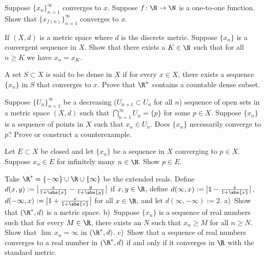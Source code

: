 \documentclass[12pt]{book}
\begin{document}
\begin{exercise}
Suppose $\{x_n\}_{n=1}^\infty$ converges to $x$.
Suppose $f \colon \N
\to \N$ is a one-to-one function.
Show that
$\{ x_{f(n)} \}_{n=1}^\infty$ converges to $x$.
\end{exercise}

\begin{exercise}
If $(X,d)$ is a metric space where $d$ is the discrete metric.
Suppose 
$\{ x_n \}$ is a convergent sequence in $X$.
Show that there exists
a $K \in \N$ such that for all $n \geq K$ we have $x_n = x_K$.
\end{exercise}

\begin{exercise}
A set $S \subset X$ is said to be dense in $X$ if for every $x \in X$,
there exists a sequence $\{ x_n \}$ in $S$ that converges to $x$.
Prove
that $\R^n$ contains a countable dense subset.
\end{exercise}

\begin{exercise}[Tricky]
Suppose $\{ U_n \}_{n=1}^\infty$ be a decreasing ($U_{n+1} \subset U_n$ for
all $n$) sequence of open sets in a metric space $(X,d)$ such that
$\bigcap_{n=1}^\infty U_n = \{ p \}$ for some $p \in X$.
Suppose 
$\{ x_n \}$ is a sequence of points in $X$ such that $x_n \in U_n$.
Does
$\{ x_n \}$ necessarily converge to $p$?
  Prove or construct a counterexample.
\end{exercise}

\begin{exercise}
Let $E \subset X$ be closed and
let $\{ x_n \}$ be a sequence in $X$ converging to $p \in X$.
Suppose
$x_n \in E$ for infinitely many $n \in \N$.
Show $p \in E$.
\end{exercise}

\begin{exercise}
Take $\R^* = \{ -\infty \} \cup \R \cup \{ \infty \}$ be the extended reals.
Define $d(x,y) := \bigl\lvert \frac{x}{1+\abs{x}} - \frac{y}{1+\abs{y}}
\bigr\rvert$
if $x, y \in \R$,
define $d(\infty,x) := \bigl\lvert 1 - \frac{x}{1+\abs{x}} \bigr\rvert$,
$d(-\infty,x) := \bigl\lvert 1 + \frac{x}{1+\abs{x}} \bigr\rvert$
for all $x \in \R$, and
let $d(\infty,-\infty) := 2$.
a)~Show that $(\R^*,d)$ is a metric space.
b)~Suppose $\{ x_n \}$ is a sequence of real numbers such that
for every $M \in \R$, there exists an $N$ such that
$x_n \geq M$ for all $n \geq N$.
Show that $\lim\, x_n = \infty$ in
$(\R^*,d)$.
c)~Show that a sequence of real numbers converges to a real number
in $(\R^*,d)$ if and
only if it converges in $\R$ with the standard metric.
\end{exercise}
\end{document}

